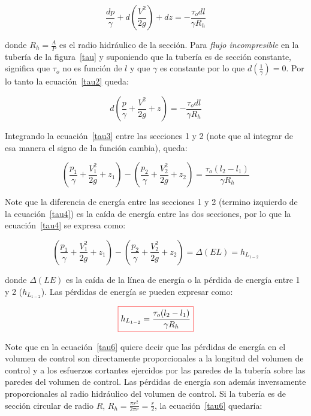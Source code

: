 \documentclass[11pt, oneside]{article}
\begin{document}
\begin{equation}
\frac{dp}{\gamma} + d\left( \frac{V^2}{2g} \right) + dz = -\frac{\tau_{o} dl}{\gamma R_h}
\label{tau2}
\end{equation}

donde $R_h = \frac{A}{P}$ es el radio hidr\'aulico de la secci\'on. Para \emph{flujo incompresible} en la tuber\'ia de la figura~\ref{tau}  y suponiendo que la tuber\'ia es de secci\'on constante, significa que $\tau_{o}$ no es funci\'on de $l$ y que $\gamma$ es constante por lo que $d\left( \frac{1}{\gamma} \right)=0$. Por lo tanto la ecuaci\'on~\ref{tau2} queda:

\begin{equation}
d \left( \frac{p}{\gamma} +\frac{V^2}{2g} + z \right) = -\frac{\tau_o dl}{\gamma R_h}
\label{tau3}
\end{equation}

Integrando la ecuaci\'on~\ref{tau3} entre las secciones 1 y 2 (note que al integrar de esa manera el signo de la funci\'on cambia), queda: 

\begin{equation}
\left( \frac{p_1}{\gamma} +\frac{V_1^2}{2g} + z_1 \right) - \left( \frac{p_2}{\gamma} +\frac{V_2^2}{2g} + z_2 \right) = \frac{\tau_o (l_2 - l_1 )}{\gamma R_h}  
\label{tau4}
\end{equation}

Note que la diferencia de energ\'ia entre las secciones 1 y 2 (termino izquierdo de la ecuaci\'on~\ref{tau4}) es la ca\'ida de energ\'ia entre las dos secciones, por lo que la ecuaci\'on~\ref{tau4} se expresa como:

\begin{equation}
\left( \frac{p_1}{\gamma} +\frac{V_1^2}{2g} + z_1 \right) - \left( \frac{p_2}{\gamma} +\frac{V_2^2}{2g} + z_2 \right) = \Delta (EL) = h_{L_{1-2}}
\label{tau5}
\end{equation}

donde $\Delta (LE)$ es la ca\'ida de la l\'inea de energ\'ia o la p\'erdida de energ\'ia entre 1 y 2 ($h_{L_{1-2}}$). Las p\'erdidas de energ\'ia se pueden expresar como:

\begin{equation}
\color{red}\boxed{\color{black} h_{L_{1-2}} = \frac{\tau_o (l_2 - l_1 )}{\gamma R_h} }  
\label{tau6}
\end{equation}

Note que en la ecuaci\'on~\ref{tau6} quiere decir que las p\'erdidas de energ\'ia en el volumen de control son directamente proporcionales a la longitud del volumen de control y a los esfuerzos cortantes ejercidos por las paredes de la tuber\'ia sobre las paredes del volumen de control. Las p\'erdidas de energ\'ia son adem\'as inversamente proporcionales al radio hidr\'aulico del volumen de control. Si la tuber\'ia es de secci\'on circular de radio $R$, $R_h = \frac{\pi r^2}{2\pi r} = \frac{r}{2}$,  la ecuaci\'on~\ref{tau6} quedar\'ia:
\end{document}
